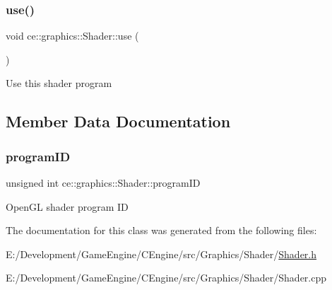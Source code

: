 \subsubsection{\texorpdfstring{use()}{use()}}
{\footnotesize\ttfamily void ce\+::graphics\+::\+Shader\+::use (\begin{DoxyParamCaption}{ }\end{DoxyParamCaption})}

Use this shader program 

\subsection{Member Data Documentation}
\mbox{\label{classce_1_1graphics_1_1_shader_a5b5ac3fe6dd6c31fb774d3b670d87c8d}} 
\subsubsection{\texorpdfstring{program\+ID}{programID}}
{\footnotesize\ttfamily unsigned int ce\+::graphics\+::\+Shader\+::program\+ID\hspace{0.3cm}{\ttfamily [protected]}}

Open\+GL shader program ID 

The documentation for this class was generated from the following files\+:\begin{DoxyCompactItemize}
\item 
E\+:/\+Development/\+Game\+Engine/\+C\+Engine/src/\+Graphics/\+Shader/\hyperlink{_shader_8h}{Shader.\+h}\item 
E\+:/\+Development/\+Game\+Engine/\+C\+Engine/src/\+Graphics/\+Shader/Shader.\+cpp\end{DoxyCompactItemize}
